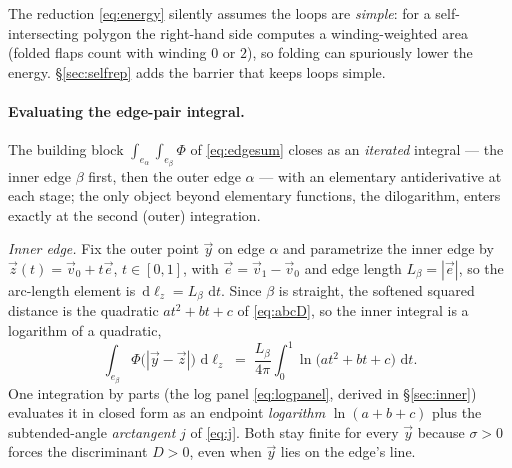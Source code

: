 \documentclass[11pt]{article}
\newcommand{\dd}{\,\mathrm{d}}
\begin{document}
The reduction \eqref{eq:energy} silently assumes the loops are \emph{simple}: for a
self-intersecting polygon the right-hand side computes a winding-weighted area
(folded flaps count with winding $0$ or $2$), so folding can spuriously lower the
energy.  \S\ref{sec:selfrep} adds the barrier that keeps loops simple.

\paragraph{Evaluating the edge-pair integral.}
The building block $\int_{e_\alpha}\!\int_{e_\beta}\Phi$ of \eqref{eq:edgesum} closes as an
\emph{iterated} integral --- the inner edge $\beta$ first, then the outer edge $\alpha$ ---
with an elementary antiderivative at each stage; the only object beyond elementary functions,
the dilogarithm, enters exactly at the second (outer) integration.

\emph{Inner edge.}  Fix the outer point $\vec y$ on edge $\alpha$ and parametrize the inner
edge by $\vec z(t)=\vec v_0+t\vec e$, $t\in[0,1]$, with $\vec e=\vec v_1-\vec v_0$ and edge
length $L_\beta=|\vec e|$, so the arc-length element is $\dd\ell_z=L_\beta\,\dd t$.  Since
$\beta$ is straight, the softened squared distance is the quadratic $a t^2+bt+c$ of
\eqref{eq:abcD}, so the inner integral is a logarithm of a quadratic,
\begin{equation}
  \int_{e_\beta}\Phi\bigl(|\vec y-\vec z|\bigr)\,\dd\ell_z
  \;=\; \frac{L_\beta}{4\pi}\int_0^1\ln\!\bigl(a t^2+bt+c\bigr)\,\dd t .
  \label{eq:innerbuild}
\end{equation}
One integration by parts (the log panel \eqref{eq:logpanel}, derived in \S\ref{sec:inner})
evaluates it in closed form as an endpoint \emph{logarithm} $\ln(a{+}b{+}c)$ plus the
subtended-angle \emph{arctangent} $j$ of \eqref{eq:j}.  Both stay finite for every $\vec y$
because $\sigma>0$ forces the discriminant $D>0$, even when $\vec y$ lies on the edge's line.
\end{document}
